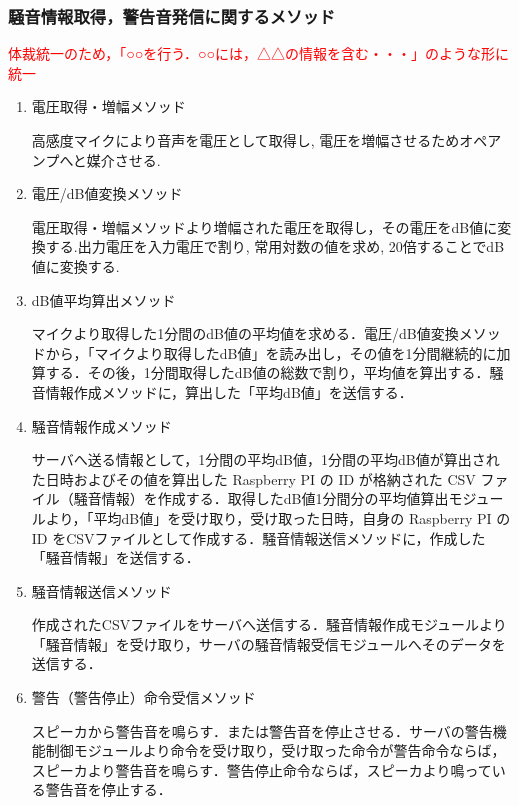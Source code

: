 \subsubsection{騒音情報取得，警告音発信に関するメソッド}
\textcolor{red}{体裁統一のため，「○○を行う．○○には，△△の情報を含む・・・」のような形に統一}
\begin{enumerate}
\renewcommand{\labelenumi}{(\arabic{enumi})}
 \item 電圧取得・増幅メソッド

高感度マイクにより音声を電圧として取得し, 電圧を増幅させるためオペアンプへと媒介させる.

\item 電圧/dB値変換メソッド

電圧取得・増幅メソッドより増幅された電圧を取得し，その電圧をdB値に変換する.出力電圧を入力電圧で割り, 常用対数の値を求め, 20倍することでdB値に変換する.

\item dB値平均算出メソッド

マイクより取得した1分間のdB値の平均値を求める．電圧/dB値変換メソッドから，「マイクより取得したdB値」を読み出し，その値を1分間継続的に加算する．その後，1分間取得したdB値の総数で割り，平均値を算出する．騒音情報作成メソッドに，算出した「平均dB値」を送信する．

\item 騒音情報作成メソッド

サーバへ送る情報として，1分間の平均dB値，1分間の平均dB値が算出された日時およびその値を算出した Raspberry PI の ID が格納された CSV ファイル（騒音情報）を作成する．取得したdB値1分間分の平均値算出モジュールより，「平均dB値」を受け取り，受け取った日時，自身の Raspberry PI の ID をCSVファイルとして作成する．騒音情報送信メソッドに，作成した「騒音情報」を送信する．

\item 騒音情報送信メソッド

作成されたCSVファイルをサーバへ送信する．騒音情報作成モジュールより「騒音情報」を受け取り，サーバの騒音情報受信モジュールへそのデータを送信する．

\item 警告（警告停止）命令受信メソッド

スピーカから警告音を鳴らす．または警告音を停止させる．サーバの警告機能制御モジュールより命令を受け取り，受け取った命令が警告命令ならば，スピーカより警告音を鳴らす．警告停止命令ならば，スピーカより鳴っている警告音を停止する．

\end{enumerate}

